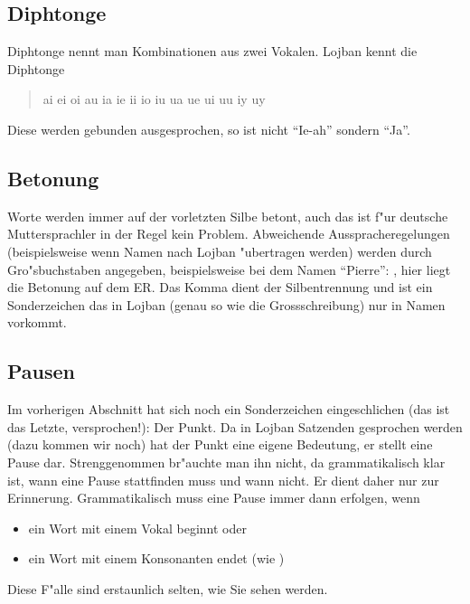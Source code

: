 \subsection{Diphtonge}
Diphtonge nennt man Kombinationen aus zwei Vokalen. Lojban kennt die Diphtonge
\begin{quote}
ai ei oi au ia ie ii io iu ua ue ui uu iy uy
\end{quote}
Diese werden gebunden ausgesprochen, so ist  nicht ``Ie-ah'' sondern ``Ja''.

\subsection{Betonung}
Worte werden immer auf der vorletzten Silbe betont, auch das ist f"ur deutsche Muttersprachler in der Regel kein Problem. Abweichende
Ausspracheregelungen (beispielsweise wenn Namen nach Lojban "ubertragen werden) werden durch Gro"sbuchstaben angegeben,
beispielsweise bei dem Namen ``Pierre'': , hier liegt die Betonung auf dem ER. Das Komma dient der Silbentrennung und ist
ein Sonderzeichen das in Lojban (genau so wie die Grossschreibung) nur in Namen vorkommt.

\subsection{Pausen}
Im vorherigen Abschnitt hat sich noch ein Sonderzeichen eingeschlichen (das ist das Letzte, versprochen!): Der Punkt. Da in Lojban
Satzenden gesprochen werden (dazu kommen wir noch) hat der Punkt eine eigene Bedeutung, er stellt eine Pause dar. Strenggenommen
br"auchte man ihn nicht, da grammatikalisch klar ist, wann eine Pause stattfinden muss und wann nicht. Er dient daher nur zur Erinnerung.
Grammatikalisch muss eine Pause immer dann erfolgen, wenn
\begin{itemize}
\item ein Wort mit einem Vokal beginnt oder
\item ein Wort mit einem Konsonanten endet (wie )
\end{itemize}
Diese F"alle sind erstaunlich selten, wie Sie sehen werden.

